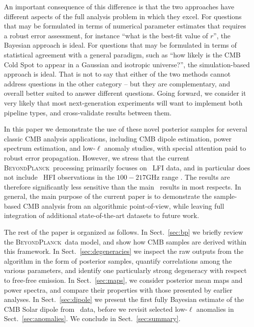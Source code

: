 \documentclass[twocolumn]{aa}
\newcommand{\BP}{\textsc{BeyondPlanck}}
\begin{document}
An important consequence of this difference is that the two approaches
have different aspects of the full analysis problem in which they
excel. For questions that may be formulated in terms of numerical
parameter estimates that requires a robust error assessment, for instance
``what is the best-fit value of $r$'', the Bayesian approach is
ideal. For questions that may be formulated in terms of statistical
agreement with a general paradigm, such as ``how likely is the CMB
Cold Spot to appear in a Gaussian and isotropic universe?'', the
simulation-based approach is ideal. That is not to say that either of
the two methods cannot address questions in the other category -- but
they are complementary, and overall better suited to answer different
questions. Going forward, we consider it very likely that most
next-generation experiments will want to implement both pipeline
types, and cross-validate results between them.

In this paper we demonstrate the use of these novel posterior samples
for several classic CMB analysis applications, including CMB dipole
estimation, power spectrum estimation, and low-$\ell$ anomaly studies,
with special attention paid to robust error propagation. However, we
stress that the current \BP\ processing primarily focuses on
\Planck\ LFI data, and in particular does not include
\Planck\ HFI observations in the $100-217$GHz range \citep{bp01}. The results are therefore
significantly less sensitive than the main \Planck\ results in most
respects. In general, the main purpose of the current paper is to
demonstrate the sample-based CMB analysis from an
algorithmic point-of-view, while leaving full integration of
additional state-of-the-art datasets to future work.

The rest of the paper is organized as follows. In Sect.~\ref{sec:bp}
we briefly review the \BP\ data model, and show how CMB samples are
derived within this framework. In Sect.~\ref{sec:degeneracies} we
inspect the raw outputs from the algorithm in the form of posterior
samples, quantify correlations among the various parameters, and
identify one particularly strong degeneracy with respect to free-free
emission. In Sect.~\ref{sec:maps}, we consider posterior mean maps and
power spectra, and compare their properties with those presented by
earlier analyses. In Sect.~\ref{sec:dipole} we present the first fully
Bayesian estimate of the CMB Solar dipole from \Planck\ data, before
we revisit selected low-$\ell$ anomalies in
Sect.~\ref{sec:anomalies}. We conclude in Sect.~\ref{sec:summary}.
\end{document}
